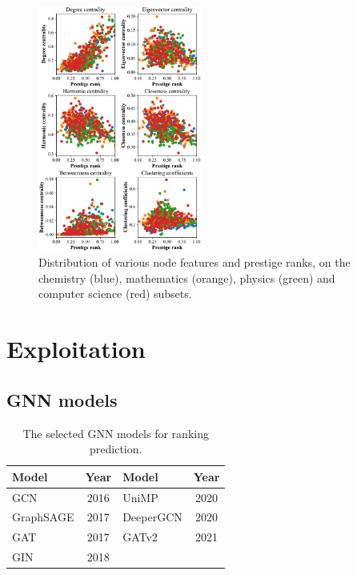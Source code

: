 \documentclass[journal]{IEEEtran}
\begin{document}
\begin{figure}[htbp]
\centerline{\includegraphics[width=0.48\textwidth]{figures/fig2.pdf}}
\caption{Distribution of various node features and prestige ranks, on the chemistry (blue), mathematics (orange), physics (green) and computer science (red) subsets.}
\label{fig2}
\end{figure}


\section{Exploitation}


\subsection{GNN models}

\begin{table}[htbp]
\caption{The selected GNN models for ranking prediction.}
\begin{center}
\begin{tabular}{lc | lc }
\hline
\textbf{Model} & \textbf{Year} & \textbf{Model} & \textbf{Year}  \\
\hline
GCN  &  2016  &  UniMP  &  2020   \\
GraphSAGE  &  2017 & DeeperGCN  &  2020    \\
GAT  & 2017  & GATv2  &  2021     \\
GIN  & 2018  &   &     \\
\hline
\end{tabular}
\label{t2}
\end{center}
\end{table}
\end{document}
